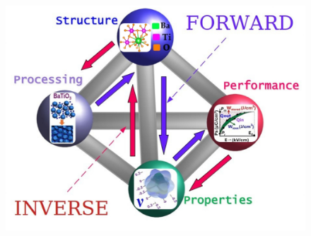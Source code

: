 \documentclass[a4paper,fleqn]{cas-sc}
\begin{document}
\begin{figure}
    \centering
    \includegraphics[width=0.975\linewidth]{figures/Psp_Schematic} 

\end{figure}
\end{document}
